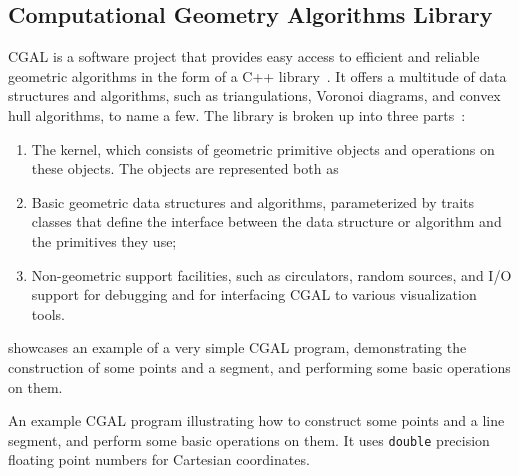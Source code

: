 \subsection{Computational Geometry Algorithms Library}%
\label{sec:solution.impl.cgal}

\Ac{CGAL} is a software project that provides easy access to efficient and
reliable geometric algorithms in the form of a C++
library~\cite{CGAL:5.3:Project}.  It offers a multitude of data structures and
algorithms, such as triangulations, Voronoi diagrams, and convex hull
algorithms, to name a few.  The library is broken up into three
parts~\cite{CGAL:5.3:23LGK}:
\begin{enumerate}
  \item The kernel, which consists of geometric primitive objects and operations
  on these objects.  The objects are represented both as
  \item Basic geometric data structures and algorithms, parameterized by traits
  classes that define the interface between the data structure or algorithm and
  the primitives they use;
  \item Non-geometric support facilities, such as circulators, random sources,
  and I/O support for debugging and for interfacing \ac{CGAL} to various
  visualization tools.
\end{enumerate}

 showcases an example of a very simple
\ac{CGAL} program, demonstrating the construction of some points and a segment,
and performing some basic operations on them.

\begin{listing}[htbp]
  \caption[CGAL: Three points and one segment]{
    An example CGAL program illustrating how to construct some points and a line
    segment, and perform some basic operations on them.  It uses
    \texttt{double} precision floating point numbers for Cartesian
    coordinates.}\label{lst:solution.impl.cgal.pas}
  \inputminted{cpp}{cpp/points_and_segments.cpp}
\end{listing}

